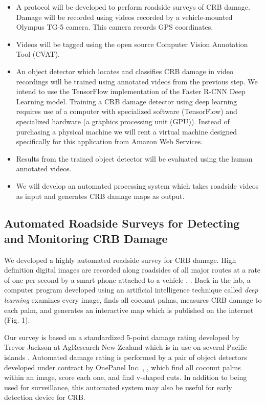 \documentclass[12pt,letterpaper,english,bibliography=totocnumbered,abstract=on]{scrartcl}
\begin{document}
\begin{framed}
\begin{itemize}
	\item A protocol will be developed to perform roadside surveys of CRB damage. Damage will be recorded using videos recorded by a vehicle-mounted Olympus TG-5 camera. This camera records GPS coordinates.
	\item Videos will be tagged using the open source Computer Vision Annotation Tool (CVAT).
	\item An object detector which locates and classifies CRB damage in video recordings will be trained using annotated videos from the previous step. We intend to use the TensorFlow implementation of the Faster R-CNN Deep Learning model. Training a CRB damage detector using deep learning requires use of a computer with specialized software (TensorFlow) and specialized hardware (a graphics processing unit (GPU)). Instead of purchasing a physical machine we will rent a virtual machine designed specifically for this application from Amazon Web Services.
	\item Results from the trained object detector will be evaluated using the human annotated videos.
	\item We will develop an automated processing system which takes roadside videos as input and generates CRB damage maps as output.
\end{itemize}
\end{framed}

\subsection{Automated Roadside Surveys for Detecting and Monitoring CRB Damage}

We developed a highly automated roadside survey for CRB damage.
High definition digital images are recorded along roadsides of all major routes at a rate of one per second by a smart phone attached to a vehicle \cite{mooreSetAutomatedRoadside2020}, \cite{mooreYouTubeVideoMounting2020}. Back in the lab, a computer program developed using an artificial intelligence technique called \emph{deep learning} examines every image, finds all coconut palms, measures CRB damage to each palm, and generates an interactive map which is published on the internet (Fig. 1).

Our survey is based on a standardized 5-point damage rating developed by Trevor Jackson at AgResearch New Zealand which is in use on several Pacific islands \cite{mooreAutomatedRoadsideVideo2020}. Automated damage rating is performed by a pair of object detectors developed under contract by OnePanel Inc. \cite{mooreRequestInterestObject2020}, \cite{onepanelinc.ScopeWorkObject2020}, \cite{onepanelinc.AIPipelineOperations2020} which find all coconut palms within an image, score each one, and find v-shaped cuts. In addition to being used for surveillance, this automated system may also be useful for early detection device for CRB.
\end{document}
